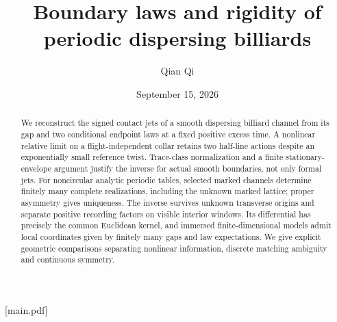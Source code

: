
[main.pdf]
\title[Boundary laws and periodic rigidity]{Boundary laws and rigidity of periodic dispersing billiards}
\author{Qian Qi}
\date{September 15, 2026}


\begin{abstract}
We reconstruct the signed contact jets of a smooth dispersing billiard
channel from its gap and two conditional endpoint laws at a fixed positive
excess time. A nonlinear relative limit on a flight-independent collar
retains two half-line actions despite an exponentially small reference
twist. Trace-class normalization and a finite stationary-envelope argument
justify the inverse for actual smooth boundaries, not only formal jets.
For noncircular analytic periodic tables, selected marked channels determine
finitely many complete realizations, including the unknown marked lattice;
proper asymmetry gives uniqueness. The inverse survives unknown transverse
origins and separate positive recording factors on visible interior windows.
Its differential has precisely the common Euclidean kernel, and immersed
finite-dimensional models admit local coordinates given by finitely many
gaps and law expectations. We give explicit geometric comparisons separating
nonlinear information, discrete matching ambiguity and continuous symmetry.
\end{abstract}
\maketitle
\setcounter{tocdepth}{1}
\tableofcontents

